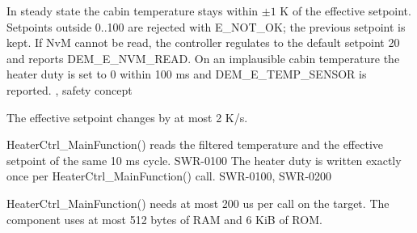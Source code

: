 %

  {In steady state the cabin temperature stays within $\pm 1$ K of the effective setpoint.}
  {}
  {Setpoints outside 0..100 are rejected with E_NOT_OK; the previous setpoint is kept.}
  {}
  {If NvM cannot be read, the controller regulates to the default setpoint 20 and reports DEM_E_NVM_READ.}
  {}
  {On an implausible cabin temperature the heater duty is set to 0 within 100 ms and DEM_E_TEMP_SENSOR is reported.}
  {, safety concept}

  {The effective setpoint changes by at most 2 K/s.}
  {}

  {HeaterCtrl_MainFunction() reads the filtered temperature and the effective setpoint of the same 10 ms cycle.}
  {SWR-0100}
  {The heater duty is written exactly once per HeaterCtrl_MainFunction() call.}
  {SWR-0100, SWR-0200}

  {HeaterCtrl_MainFunction() needs at most 200 us per call on the target.}
  {}
  {The component uses at most 512 bytes of RAM and 6 KiB of ROM.}
  {}


